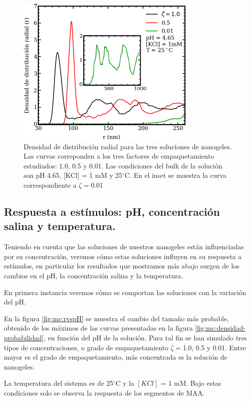 	
	\begin{figure}
		\centering
		\includegraphics[width=0.45\linewidth]{Figures/graph-mc/rdf-normal.pdf}
		\caption{Densidad de distribuci\'on radial para las tres soluciones de nanogeles. Las curvas correponden a los tres factores de empaquetamiento estudiados: 1.0, 0.5 y 0.01. Las condiciones del bulk de la soluci\'on son pH 4.65, [KCl] = 1 mM y 25$^\circ$C. En el inset se muestra la curva correspondiente a $\zeta = $0.01}
		\label{fig:mc:rdf}
	\end{figure}
	
	
	\subsection{Respuesta a est\'imulos: pH, concentraci\'on salina y temperatura.}
	
	Teniendo en cuenta que las soluciones de nuestros nanogeles est\'an influenciadas por su concentraci\'on, veremos c\'omo estas soluciones influyen en su respuesta a est\'imulos, en particular los resultados que mostramos m\'as abajo surgen de los cambios en el pH, la concentraci\'on salina y la temperatura.
	
	En primera instancia veremos c\'omo se comportan las soluciones con la variaci\'on del pH.
	
	En la figura \ref{fig:mc:rvspH} se muestra el cambio del tama\~no m\'as probable, obtenido de los m\'aximos de las curvas presentadas en la figura \ref{fig:mc:densidad-probabilidad}, en funci\'on del pH de la soluci\'on. Para tal fin se han simulado tres tipos de concentraciones, o grado de empaquetamiento $\zeta = $1.0, 0.5 y 0.01. Entre mayor es el grado de empaquetamiento, m\'as concentrada es la soluci\'on de nanogeles.
	
	La temperatura del sistema es de 25$^\circ$C y la $[KCl]$ = 1 mM. Bajo estas condiciones solo se observa la respuesta de los segmentos de MAA.
	
	
	
